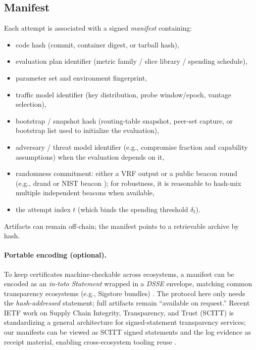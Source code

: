 \documentclass[11pt]{article}
\begin{document}
\subsection{Manifest}

Each attempt is associated with a signed \emph{manifest} containing:
\begin{itemize}
\item code hash (commit, container digest, or tarball hash),
\item evaluation plan identifier (metric family / slice library / spending schedule),
\item parameter set and environment fingerprint,
\item traffic model identifier (key distribution, probe window/epoch, vantage selection),
\item bootstrap / snapshot hash (routing-table snapshot, peer-set capture, or bootstrap list used to initialize the evaluation),
\item adversary / threat model identifier (e.g., compromise fraction and capability assumptions) when the evaluation depends on it,
\item randomness commitment: either a VRF output \cite{rfc9381,micali1999vrf} or a public beacon round (e.g., drand \cite{drand_spec} or NIST beacon \cite{nist_beacon,nist_ir8213_2019}); for robustness, it is reasonable to hash-mix multiple independent beacons when available,
\item the attempt index $t$ (which binds the spending threshold $\delta_t$).
\end{itemize}
Artifacts can remain off-chain; the manifest points to a retrievable archive by hash.

\paragraph{Portable encoding (optional).}
To keep certificates machine-checkable across ecosystems, a manifest can be encoded as an \emph{in-toto Statement} wrapped in a \emph{DSSE} envelope, matching common transparency ecosystems (e.g., Sigstore bundles) \cite{intoto_statement_spec,intoto_envelope_spec,dsse_spec,sigstore_bundle_spec}.
The protocol here only needs the \emph{hash-addressed} statement; full artifacts remain ``available on request.''
Recent IETF work on Supply Chain Integrity, Transparency, and Trust (SCITT) is standardizing a general architecture for signed-statement transparency services; our manifests can be viewed as SCITT signed statements and the log evidence as receipt material, enabling cross-ecosystem tooling reuse \cite{ietf_scitt_architecture}.
\end{document}
